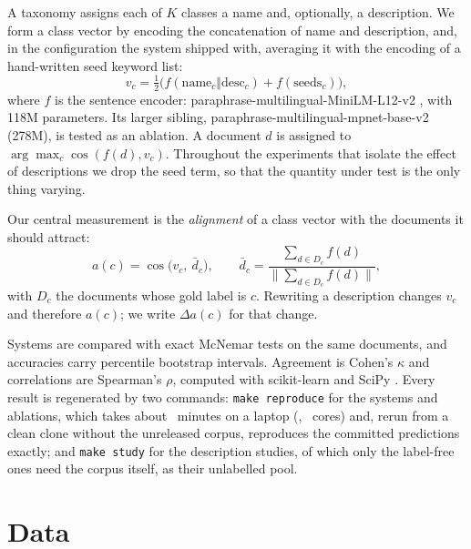 \documentclass[11pt]{article}
\begin{document}
A taxonomy assigns each of $K$ classes a name and, optionally, a description.
We form a class vector by encoding the concatenation of name and description,
and, in the configuration the system shipped with, averaging it with the
encoding of a hand-written seed keyword list:
\[
  v_c = \tfrac{1}{2}\big(f(\text{name}_c \Vert \text{desc}_c) + f(\text{seeds}_c)\big),
\]
where $f$ is the sentence encoder: paraphrase-\allowbreak multilingual-\allowbreak MiniLM-\allowbreak L12-\allowbreak v2
\citep{reimers-gurevych-2020-making}, with 118M parameters. Its larger sibling,
paraphrase-\allowbreak multilingual-\allowbreak mpnet-\allowbreak base-\allowbreak v2 (278M), is tested as an ablation.
A document $d$ is assigned to
$\arg\max_c \cos(f(d), v_c)$. Throughout the experiments that isolate the effect
of descriptions we drop the seed term, so that the quantity under test is the
only thing varying.

Our central measurement is the \emph{alignment} of a class vector with the
documents it should attract:
\[
  a(c) = \cos\!\big(v_c,\ \bar{d}_c\big),\qquad
  \bar{d}_c = \frac{\sum_{d \in D_c} f(d)}{\lVert \sum_{d \in D_c} f(d)\rVert},
\]
with $D_c$ the documents whose gold label is $c$. Rewriting a description
changes $v_c$ and therefore $a(c)$; we write $\Delta a(c)$ for that change.

Systems are compared with exact McNemar tests on the same documents, and
accuracies carry percentile bootstrap intervals. Agreement is Cohen's
$\kappa$ and correlations are Spearman's $\rho$, computed with scikit-learn
\citep{pedregosa-etal-2011-scikit} and SciPy \citep{virtanen-etal-2020-scipy}.
Every result is regenerated by two commands: \texttt{make reproduce} for the
systems and ablations, which takes about \ReproduceMinutes~minutes on a laptop
(\ReproduceCPU, \ReproduceCores\ cores) and, rerun from a clean clone without
the unreleased corpus, reproduces the committed predictions exactly; and
\texttt{make study} for the description studies, of which only the label-free
ones need the corpus itself, as their unlabelled pool.

\section{Data}
\end{document}
